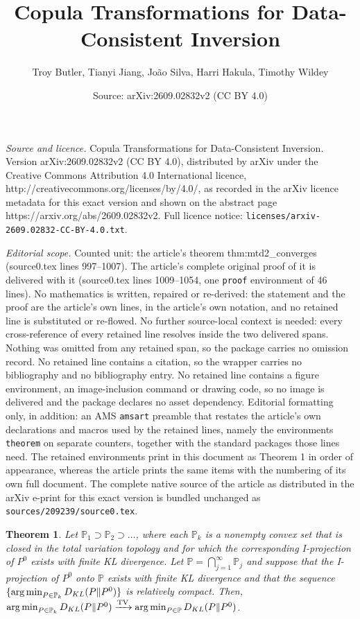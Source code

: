 \documentclass[10pt,a4paper]{amsart}
\title{Copula Transformations for Data-Consistent Inversion}
\author{Troy Butler, Tianyi Jiang, Jo\~ao Silva, Harri Hakula, Timothy Wildey}
\date{Source: arXiv:2609.02832v2 (CC BY 4.0)}
\newtheorem{theorem}{Theorem}
\DeclareMathOperator*{\argmin}{arg\,min}
\newcommand{\p}{\mathbb{P}}
\begin{document}
\maketitle

\noindent\emph{Source and licence.} Copula Transformations for Data-Consistent Inversion. Version arXiv:2609.02832v2 (CC BY 4.0), distributed by arXiv under the Creative Commons Attribution 4.0 International licence, http://creativecommons.org/licenses/by/4.0/, as recorded in the arXiv licence metadata for this exact version and shown on the abstract page https://arxiv.org/abs/2609.02832v2. Full licence notice: \texttt{licenses/arxiv-2609.02832-CC-BY-4.0.txt}.\par\smallskip

\noindent\textit{Editorial scope.} Counted unit: the article's theorem thm:mtd2\_converges (source0.tex lines 997--1007). The article's complete original proof of it is delivered with it (source0.tex lines 1009--1054, one \texttt{proof} environment of 46 lines). No mathematics is written, repaired or re-derived: the statement and the proof are the article's own lines, in the article's own notation, and no retained line is substituted or re-flowed.  No further source-local context is needed: every cross-reference of every retained line resolves inside the two delivered spans.  Nothing was omitted from any retained span, so the package carries no omission record.  No retained line contains a citation, so the wrapper carries no bibliography and no bibliography entry.  No retained line contains a figure environment, an image-inclusion command or drawing code, so no image is delivered and the package declares no asset dependency.  Editorial formatting only, in addition: an AMS \texttt{amsart} preamble that restates the article's own declarations and macros used by the retained lines, namely the environments \texttt{theorem} on separate counters, together with the standard packages those lines need.  The retained environments print in this document as Theorem 1 in order of appearance, whereas the article prints the same items with the numbering of its own full document.  The complete native source of the article as distributed in the arXiv e-print for this exact version is bundled unchanged as \texttt{sources/209239/source0.tex}.
\begin{theorem}\label{thm:mtd2_converges}
Let $\p_{1} \supset \p_{2} \supset \dots$, where each $\p_k$ is a nonempty convex set that is closed in the total variation topology and for which the corresponding I-projection of $P^0$ exists with finite KL divergence.
Let $\p= \bigcap_{j=1}^{\infty}\p_j$ and suppose that the I-projection of $P^0$ onto $\p$ exists with finite KL divergence and that
the sequence $\{\argmin_{P \in \p_{k}}D_{\rm KL}(P \| P^{0})\}$ is relatively compact.
Then,
$
\argmin_{P \in \p_{k}}D_{\rm KL}(P \| P^{0})
\xrightarrow{\mathrm{TV}}
\argmin_{P \in \p}D_{\rm KL}(P \| P^{0})
$.
\end{theorem}
\end{document}
